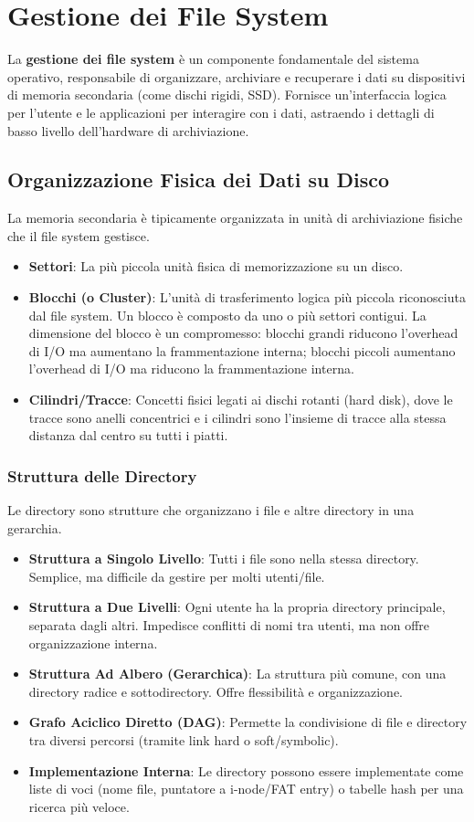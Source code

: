 \section{Gestione dei File System}
La \textbf{gestione dei file system} è un componente fondamentale del sistema operativo, responsabile di organizzare, archiviare e recuperare i dati su dispositivi di memoria secondaria (come dischi rigidi, SSD). Fornisce un'interfaccia logica per l'utente e le applicazioni per interagire con i dati, astraendo i dettagli di basso livello dell'hardware di archiviazione.

\subsection{Organizzazione Fisica dei Dati su Disco}
La memoria secondaria è tipicamente organizzata in unità di archiviazione fisiche che il file system gestisce.
\begin{itemize}
    \item \textbf{Settori}: La più piccola unità fisica di memorizzazione su un disco.
    \item \textbf{Blocchi (o Cluster)}: L'unità di trasferimento logica più piccola riconosciuta dal file system. Un blocco è composto da uno o più settori contigui. La dimensione del blocco è un compromesso: blocchi grandi riducono l'overhead di I/O ma aumentano la frammentazione interna; blocchi piccoli aumentano l'overhead di I/O ma riducono la frammentazione interna.
    \item \textbf{Cilindri/Tracce}: Concetti fisici legati ai dischi rotanti (hard disk), dove le tracce sono anelli concentrici e i cilindri sono l'insieme di tracce alla stessa distanza dal centro su tutti i piatti.
\end{itemize}

\subsubsection{Struttura delle Directory}
Le directory sono strutture che organizzano i file e altre directory in una gerarchia.
\begin{itemize}
    \item \textbf{Struttura a Singolo Livello}: Tutti i file sono nella stessa directory. Semplice, ma difficile da gestire per molti utenti/file.
    \item \textbf{Struttura a Due Livelli}: Ogni utente ha la propria directory principale, separata dagli altri. Impedisce conflitti di nomi tra utenti, ma non offre organizzazione interna.
    \item \textbf{Struttura Ad Albero (Gerarchica)}: La struttura più comune, con una directory radice e sottodirectory. Offre flessibilità e organizzazione.
    \item \textbf{Grafo Aciclico Diretto (DAG)}: Permette la condivisione di file e directory tra diversi percorsi (tramite link hard o soft/symbolic).
\item \textbf{Implementazione Interna}: Le directory possono essere implementate come liste di voci (nome file, puntatore a i-node/FAT entry) o tabelle hash per una ricerca più veloce.
\end{itemize}

